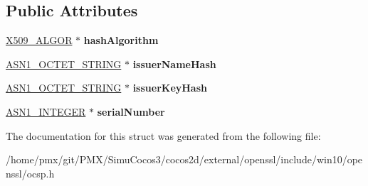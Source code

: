 \subsection*{Public Attributes}
\begin{DoxyCompactItemize}
\item 
\mbox{\label{structocsp__cert__id__st_ab33f458f416845b6342c235d1afa63be}} 
\hyperlink{structX509__algor__st}{X509\+\_\+\+A\+L\+G\+OR} $\ast$ {\bfseries hash\+Algorithm}
\item 
\mbox{\label{structocsp__cert__id__st_a778948e91d91afbfd895f5a3860d8d67}} 
\hyperlink{structasn1__string__st}{A\+S\+N1\+\_\+\+O\+C\+T\+E\+T\+\_\+\+S\+T\+R\+I\+NG} $\ast$ {\bfseries issuer\+Name\+Hash}
\item 
\mbox{\label{structocsp__cert__id__st_a46eeca1e6b207fba6e0ca844f59d6838}} 
\hyperlink{structasn1__string__st}{A\+S\+N1\+\_\+\+O\+C\+T\+E\+T\+\_\+\+S\+T\+R\+I\+NG} $\ast$ {\bfseries issuer\+Key\+Hash}
\item 
\mbox{\label{structocsp__cert__id__st_a2385792d7888751bddbaa0dc150e9fbd}} 
\hyperlink{structasn1__string__st}{A\+S\+N1\+\_\+\+I\+N\+T\+E\+G\+ER} $\ast$ {\bfseries serial\+Number}
\end{DoxyCompactItemize}


The documentation for this struct was generated from the following file\+:\begin{DoxyCompactItemize}
\item 
/home/pmx/git/\+P\+M\+X/\+Simu\+Cocos3/cocos2d/external/openssl/include/win10/openssl/ocsp.\+h\end{DoxyCompactItemize}
